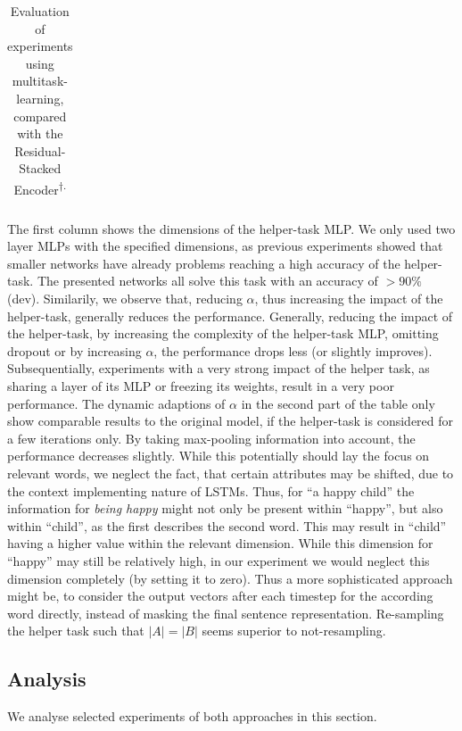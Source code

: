 \begin{table}[tph!]
{\begin{tabular}{rccc|cr|cr}
\end{tabular}}
\caption{Evaluation of experiments using multitask-learning, compared with the Residual-Stacked Encoder\textsuperscript{$\dagger$.}}
\label{tab:mt_evaluation}
\end{table}
The first column shows the dimensions of the helper-task \ac{MLP}. We only used two layer \ac{MLP}s with the specified dimensions, as previous experiments showed that smaller networks have already problems reaching a high accuracy of the helper-task. The presented networks all solve this task with an accuracy of $> 90 \%$ (dev). Similarily, we observe that, reducing  $\alpha$, thus increasing the impact of the helper-task, generally reduces the performance. Generally, reducing the impact of the helper-task, by increasing the complexity of the helper-task \ac{MLP}, omitting dropout or by increasing $\alpha$, the performance drops less (or slightly improves). Subsequentially, experiments with a very strong impact of the helper task, as sharing a layer of its \ac{MLP} or freezing its weights, result in a very poor performance. The dynamic adaptions of $\alpha$ in the second part of the table only show comparable results to the original model, if the helper-task is considered for a few iterations only. By taking max-pooling information into account, the performance decreases slightly. While this potentially should lay the focus on relevant words, we neglect the fact, that certain attributes may be shifted, due to the context implementing nature of \ac{LSTM}s. Thus, for ``a happy child'' the information for \textit{being happy} might not only be present within ``happy'', but also within ``child'', as the first describes the second word. This may result in ``child'' having a higher value within the relevant dimension. While this dimension for ``happy'' may still be relatively high, in our experiment we would neglect this dimension completely (by setting it to zero). Thus a more sophisticated approach might be, to consider the output vectors after each timestep for the according word directly, instead of masking the final sentence representation. Re-sampling the helper task such that $|A| = |B|$ seems superior to not-resampling.

\subsection{Analysis}
We analyse selected experiments of both approaches in this section.

